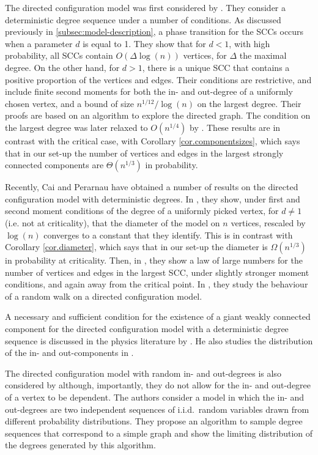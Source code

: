 The directed configuration model was first considered by \citet{cooperSizeLargestStrongly2004}. They consider a deterministic degree sequence under a number of conditions. As discussed previously in \cref{subsec:model-description}, a phase transition for the SCCs occurs when a parameter $d$ is equal to 1. They show that for $d<1$, with high probability, all SCCs contain $O(\Delta\log(n))$ vertices, for $\Delta$ the maximal degree. On the other hand, for $d>1$, there is a unique SCC that contains a positive proportion of the vertices and edges. Their conditions are restrictive, and include finite second moments for both the in- and out-degree of a uniformly chosen vertex, and a bound of size $n^{1/12}/\log(n)$ on the largest degree. Their proofs are based on an algorithm to explore the directed graph. The condition on the largest degree was later relaxed to $O(n^{1/4})$ by \citet{grafStronglyConnectedComponents2016}. These results are in contrast with the critical case, with Corollary \ref{cor.componentsizes}, which says that in our set-up the number of vertices and edges in the largest strongly connected components are $\Theta(n^{1/3})$ in probability.

Recently, Cai and Perarnau have obtained a number of results on the directed configuration model with deterministic degrees. In \cite{caiDiameterDirectedConfiguration2020}, they show, under first and second moment conditions of the degree of a uniformly picked vertex, for $d\neq 1$ (i.e. not at criticality), that the diameter of the model on $n$ vertices, rescaled by $\log(n)$ converges to a constant that they identify. This is in contrast with Corollary \ref{cor.diameter}, which says that in our set-up the diameter is $\Omega(n^{1/3})$ in probability at criticality. Then, in \cite{caiGiantComponentDirected2021}, they show a law of large numbers for the number of vertices and edges in the largest SCC, under slightly stronger moment conditions, and again away from the critical point. In \cite{caiMinimumStationaryValues2021}, they study the behaviour of a random walk on a directed configuration model.
 
A necessary and sufficient condition for the existence of a giant weakly connected component for the directed configuration model with a deterministic degree sequence is discussed in the physics literature by \citet{kryvenEmergenceGiantWeak2016}. He also studies the distribution of the in- and out-components in \cite{kryvenFiniteConnectedComponents2017}.

The directed configuration model with random in- and out-degrees is also considered by \citet{chenDirectedRandomGraphs2013} although, importantly, they do not allow for the in- and out-degree of a vertex to be dependent. The authors consider a model in which the in- and out-degrees are two independent sequences of i.i.d.\ random variables drawn from different probability distributions. They propose an algorithm to sample degree sequences that correspond to a simple graph and show the limiting distribution of the degrees generated by this algorithm. 



